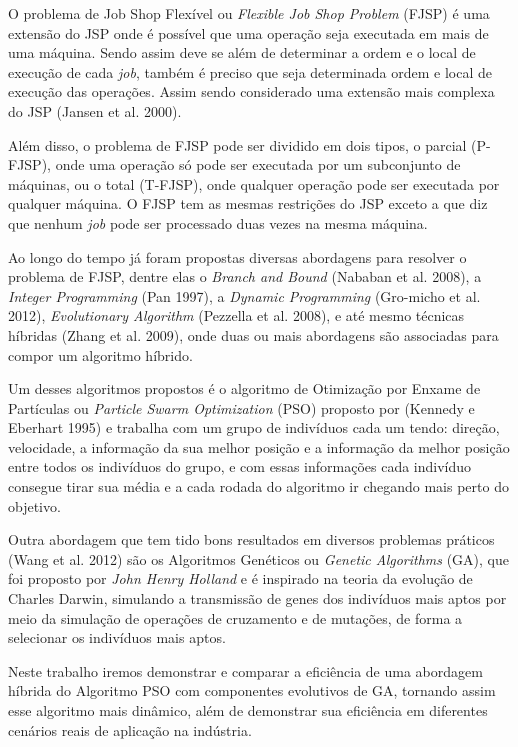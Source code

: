 O problema de Job Shop Flexível ou \textit{Flexible Job Shop Problem} (FJSP) é uma extensão do JSP onde é possível que uma operação seja executada em mais de uma máquina. Sendo assim deve se além de determinar a ordem e o local de execução de cada \textit{job}, também é preciso que seja determinada ordem e local de execução das operações. Assim sendo considerado uma extensão mais complexa do JSP (Jansen et al. 2000). \newline

Além disso, o problema de FJSP pode ser dividido em dois tipos, o parcial (P-FJSP), onde uma operação só pode ser executada por um subconjunto de máquinas, ou o total (T-FJSP), onde qualquer operação pode ser executada por qualquer máquina. O FJSP tem as mesmas restrições do JSP exceto a que diz que nenhum \textit{job} pode ser processado duas vezes na mesma máquina. \newline

Ao longo do tempo já foram propostas diversas abordagens para resolver o problema de FJSP, dentre elas o \textit{Branch and Bound} (Nababan et al. 2008), a 
\textit{Integer Programming} (Pan 1997), a 
\textit{Dynamic Programming} (Gro-micho et al. 2012), 
\textit{Evolutionary Algorithm} (Pezzella et al. 2008), e até mesmo técnicas híbridas (Zhang et al. 2009), onde duas ou mais abordagens são associadas para compor um algoritmo híbrido. \newline

Um desses algoritmos propostos é o algoritmo de Otimização por Enxame de Partículas ou \textit{Particle Swarm Optimization} (PSO) proposto por (Kennedy e Eberhart 1995) e trabalha com um grupo de indivíduos cada um tendo: direção, velocidade, a informação da sua melhor posição e a informação da melhor posição entre todos os indivíduos do grupo, e com essas informações cada indivíduo consegue tirar sua média e a cada rodada do algoritmo ir chegando mais perto do objetivo. \newline

Outra abordagem que tem tido bons resultados em diversos problemas práticos (Wang et al. 2012) são os Algoritmos Genéticos ou \textit{Genetic Algorithms} (GA), que foi proposto por \textit{John Henry Holland} e é inspirado na teoria da evolução de Charles Darwin, simulando a transmissão de genes dos indivíduos mais aptos por meio da simulação de operações de cruzamento e de mutações, de forma a selecionar os indivíduos mais aptos. \newline

Neste trabalho iremos demonstrar e comparar a eficiência de uma abordagem híbrida do Algoritmo PSO com componentes evolutivos de GA, tornando assim esse algoritmo mais dinâmico, além de demonstrar sua eficiência em diferentes cenários reais de aplicação na indústria.\newline

